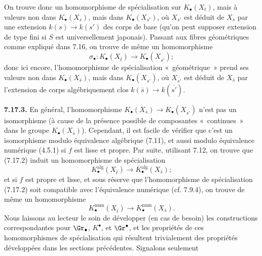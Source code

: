 
On
trouve donc un homomorphisme de spécialisation sur \(K_\bullet(X_t)\), mais à valeurs non dans \(K_\bullet(X_s)\), mais dans \(K_\bullet(X_{s'})\), où \(X_{s'}\) est déduit de \(X_s\) par une extension \(k(s)\to k(s')\) des corps de base (qu'on peut supposer extension de type fini si \(S\) est universellement japonais). Passant aux fibres géométriques comme expliqué dans 7.16, on trouve de même un homomorphisme
\begin{equation}\tag{7.17.2}
  \sigma_\bullet:K_\bullet(X_{\bar t})\longrightarrow K_\bullet(X_{\overline{s'}});
\end{equation}
donc ici encore, l'homomorphisme de spécialisation «~géométrique~» prend ses valeurs non dans \(K_\bullet(X_{\bar s})\), mais dans \(K_\bullet(X_{\overline{s'}})\), où \(X_{\overline{s'}}\) est déduit de \(X_{\bar s}\) par l'extension de corps algébriquement clos \(k(\bar s)\to k(\overline{s'})\).

\textbf{7.17.3.} En général, l'homomorphisme \(K_\bullet(X_{\bar s})\to K_\bullet(X_{\overline{s'}})\) n'est pas un isomorphisme (à cause de la présence possible de composantes «~continues~» dans le groupe \(K_\bullet(X_{\bar s})\)). Cependant, il est facile de vérifier que c'est un isomorphisme modulo équivalence algébrique (7.11), et aussi modulo équivalence numérique (4.5.1) si \(f\) est lisse et propre. Par suite, utilisant 7.12, on trouve que (7.17.2) induit un homomorphisme de spécialisation
\begin{equation}\tag{7.17.3.1}
  K_\bullet^{\mathrm{alg}}(X_{\bar t})\longrightarrow
  K_\bullet^{\mathrm{alg}}(X_{\bar s});
\end{equation}
et si \(f\) est propre et lisse, et sous réserve que l'homomorphisme de spécialisation (7.17.2) soit compatible avec l'équivalence numérique (cf. 7.9.4), on trouve de même un homomorphisme
\begin{equation}\tag{7.17.3.2}
  K_\bullet^{\mathrm{num}}(X_{\bar t})\longrightarrow
  K_\bullet^{\mathrm{num}}(X_{\bar s}).
\end{equation}
Nous laissons au lecteur le soin de développer (en cas de besoin) les constructions correspondantes pour \(\Gr_\bullet\), \(K^\bullet\), et \(\Gr^\bullet\), et les propriétés de ces homomorphismes de spécialisation qui résultent trivialement des propriétés développées dans les sections précédentes. Signalons seulement
